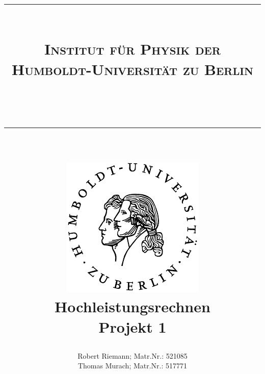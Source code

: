 \documentclass[a4paper,oneside,bibtotoc,smallheadings,pointlessnumbers,
halfparskip,DIV15]{scrartcl}
\newcommand{\lref}[1]{Listing (\ref{lst:#1})} %
\newcommand{\eref}[1]{Gl. (\ref{eqn:#1})} %
\begin{document}
\title{{\centering \rule{15cm}{0.001cm}\\
\Large{\textsc{Institut für Physik der
Humboldt-Universität zu Berlin}}}\\ \centering \rule{15cm}{0.001cm}\\
\vspace{15mm} \centering
\includegraphics[scale=0.9]{../../assets/siegel}\\
\vspace{18mm}
{\bf{\huge{Hochleistungsrechnen}}}\\
\vspace{12mm}
Projekt 1\\
\vspace{15mm}
}
\author{Robert Riemann; Matr.Nr.: 521085\\
Thomas Murach; Matr.Nr.: 517771\vspace{18mm}}
\maketitle

\newpage

% 
% 
% 
% 

%
%
% 
%
%
\end{document}
